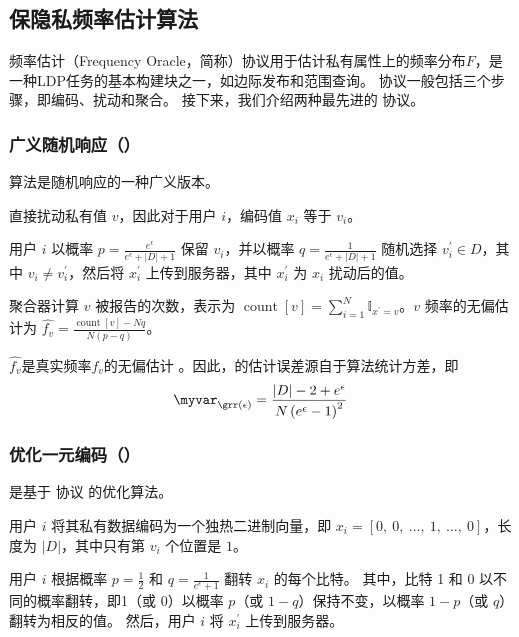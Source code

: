 \subsection{保隐私频率估计算法}
频率估计（Frequency Oracle，简称\fo）协议用于估计私有属性上的频率分布$F$，是一种LDP任务的基本构建块之一，如边际发布\cite{zhang2018calm}和范围查询\cite{wang2019answering, cormode2019answering}。
\fo 协议一般包括三个步骤，即编码、扰动和聚合\cite{wang2017locally}。
接下来，我们介绍两种最先进的 \fo 协议。 

\subsubsection{广义随机响应（\grr）}
\grr 算法是随机响应\cite{warner1965randomized}的一种广义版本。

 \grr 直接扰动私有值 $v$，因此对于用户 $i$，编码值 $x_i$ 等于 $v_i$。

 用户 $i$ 以概率 $p = \frac{e^{\epsilon}}{e^{\epsilon}+|D|+1}$ 保留 $v_i$，并以概率 $q=\frac{1}{e^{\epsilon}+|D|+1}$ 随机选择 $v_i^{\prime} \in D$，其中 $v_i \neq v_i^{\prime}$，然后将 $x_i^{\prime}$ 上传到服务器，其中 $x_i^{\prime}$ 为 $x_i$ 扰动后的值。

 聚合器计算 $v$ 被报告的次数，表示为 $\operatorname{count}[v] = \sum_{i = 1}^{N} \mathbb{I}_{{x^{\prime}=v}}$。$v$ 频率的无偏估计为
$\hat{f_v} = \frac{\operatorname{count}[v]- Nq}{N(p-q)}$。

$\hat{f_v}$是真实频率$f_v$的无偏估计 \cite{wang2019answering}。因此，\grr 的估计误差源自于算法统计方差，即
\begin{equation}
\myvar_{\grr(\epsilon)} = \frac{|D| - 2 + e^{\epsilon}}{N\left(e^{\epsilon}-1\right)^{2}}
\label{GRRVAR}
\end{equation}

\subsubsection{优化一元编码（\oue）}
\label{myoue}
\oue \cite{wang2017locally} 是基于 \rappor 协议\cite{erlingsson2014rappor} 的优化算法。

用户 $i$ 将其私有数据编码为一个独热二进制向量，即 $ x_i = [0,\ 0,\ \ldots,\ 1,\ \ldots,\ 0]$，长度为 $|D|$，其中只有第 $v_i$ 个位置是 $1$。

用户 $i$ 根据概率 $p = \frac{1}{2}$ 和 $q = \frac{1}{e^\epsilon + 1}$ 翻转 $x_i$ 的每个比特。
其中，比特 1 和 0 以不同的概率翻转，即1（或 0）以概率 $p$（或 $1-q$）保持不变，以概率 $1-p$（或 $q$）翻转为相反的值。
然后，用户 $i$ 将 $x_i^{\prime}$ 上传到服务器。

